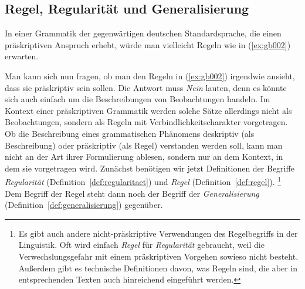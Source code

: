 \subsection{Regel, Regularität und Generalisierung}

\label{sec:regulgen}

In einer Grammatik der gegenwärtigen deutschen Standardsprache, die einen präskriptiven Anspruch erhebt, würde man vielleicht Regeln wie in (\ref{ex:gb002}) erwarten.

\begin{exe}
  \ex\label{ex:gb002}
  \begin{xlist}
  \end{xlist}
\end{exe}

Man kann sich nun fragen, ob man den Regeln in (\ref{ex:gb002}) irgendwie ansieht, dass sie präskriptiv sein sollen.
Die Antwort muss \textit{Nein} lauten, denn es könnte sich auch einfach um die Beschreibungen von Beobachtungen handeln.
Im Kontext einer präskriptiven Grammatik werden solche Sätze allerdings nicht als Beobachtungen, sondern als Regeln mit Verbindlichkeitscharakter vorgetragen.
Ob die Beschreibung eines grammatischen Phänomens deskriptiv (als Beschreibung) oder präskriptiv (als Regel) verstanden werden soll, kann man nicht an der Art ihrer Formulierung ablesen, sondern nur an dem Kontext, in dem sie vorgetragen wird.
Zunächst benötigen wir jetzt Definitionen der Begriffe \textit{Regularität} (Definition~\ref{def:regularitaet}) und \textit{Regel} (Definition~\ref{def:regel}).%
\footnote{Es gibt auch andere nicht-präskriptive Verwendungen des Regelbegriffs in der Linguistik.
Oft wird einfach \textit{Regel} für \textit{Regularität} gebraucht, weil die Verwechslungsgefahr mit einem präskriptiven Vorgehen sowieso nicht besteht.
Außerdem gibt es technische Definitionen davon, was Regeln sind, die aber in entsprechenden Texten auch hinreichend eingeführt werden.}
Dem Begriff der Regel steht dann noch der Begriff der \textit{Generalisierung} (Definition~\ref{def:generalisierung}) gegenüber.




